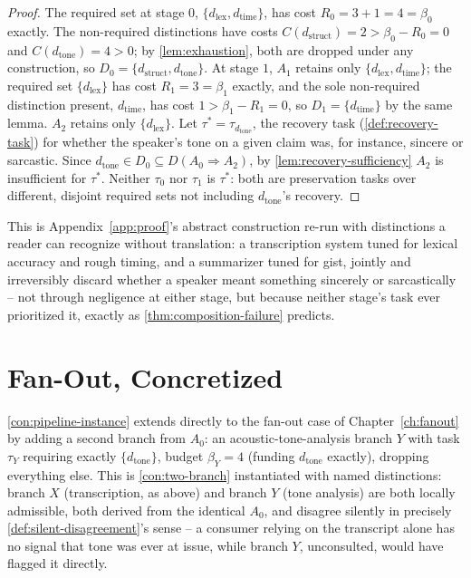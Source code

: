 \begin{proof}
The required set at stage $0$, $\{d_{\mathrm{lex}}, d_{\mathrm{time}}\}$,
has cost $R_0 = 3 + 1 = 4 = \beta_0$ exactly. The non-required
distinctions have costs $C(d_{\mathrm{struct}}) = 2 > \beta_0 - R_0 = 0$
and $C(d_{\mathrm{tone}}) = 4 > 0$; by \cref{lem:exhaustion}, both are
dropped under any construction, so $D_0 = \{d_{\mathrm{struct}},
d_{\mathrm{tone}}\}$. At stage $1$, $A_1$ retains only
$\{d_{\mathrm{lex}}, d_{\mathrm{time}}\}$; the required set
$\{d_{\mathrm{lex}}\}$ has cost $R_1 = 3 = \beta_1$ exactly, and the sole
non-required distinction present, $d_{\mathrm{time}}$, has cost $1 >
\beta_1 - R_1 = 0$, so $D_1 = \{d_{\mathrm{time}}\}$ by the same lemma.
$A_2$ retains only $\{d_{\mathrm{lex}}\}$. Let $\tau^* = \tau_{d_{\mathrm{tone}}}$,
the recovery task (\cref{def:recovery-task}) for whether the speaker's
tone on a given claim was, for instance, sincere or sarcastic. Since
$d_{\mathrm{tone}} \in D_0 \subseteq D(A_0 \Rightarrow A_2)$, by
\cref{lem:recovery-sufficiency} $A_2$ is insufficient for $\tau^*$.
Neither $\tau_0$ nor $\tau_1$ is $\tau^*$: both are preservation tasks
over different, disjoint required sets not including
$d_{\mathrm{tone}}$'s recovery.
\end{proof}

This is Appendix~\ref{app:proof}'s abstract construction re-run with
distinctions a reader can recognize without translation: a transcription
system tuned for lexical accuracy and rough timing, and a summarizer
tuned for gist, jointly and irreversibly discard whether a speaker meant
something sincerely or sarcastically -- not through negligence at either
stage, but because neither stage's task ever prioritized it, exactly as
\cref{thm:composition-failure} predicts.

\section{Fan-Out, Concretized}

\cref{con:pipeline-instance} extends directly to the fan-out case of
Chapter~\ref{ch:fanout} by adding a second branch from $A_0$: an
acoustic-tone-analysis branch $Y$ with task $\tau_Y$ requiring exactly
$\{d_{\mathrm{tone}}\}$, budget $\beta_Y = 4$ (funding $d_{\mathrm{tone}}$
exactly), dropping everything else. This is
\cref{con:two-branch} instantiated with named distinctions: branch $X$
(transcription, as above) and branch $Y$ (tone analysis) are both
locally admissible, both derived from the identical $A_0$, and disagree
silently in precisely \cref{def:silent-disagreement}'s sense -- a
consumer relying on the transcript alone has no signal that tone was
ever at issue, while branch $Y$, unconsulted, would have flagged it
directly.

